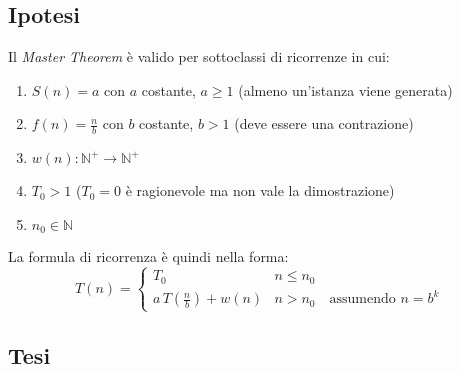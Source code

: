 \subsection{Ipotesi}
Il \textit{Master Theorem} è valido per sottoclassi di ricorrenze in cui:
\begin{enumerate}
    \item $S(n) = a$ con $a$ costante, $a \geq 1$ (almeno un'istanza viene generata)
    \item $f(n) = \frac{n}{b}$ con $b$ costante, $b > 1$ (deve essere una contrazione)
    \item $w(n): \mathbb{N}^+ \rightarrow \mathbb{N}^+$%
    \item $T_0 > 1$ ($ T_0 = 0$ è ragionevole ma non vale la dimostrazione)
    \item $n_0 \in \mathbb{N}$
\end{enumerate}
La formula di ricorrenza è quindi nella forma:
\begin{equation}
    T(n) = 
    \begin{cases} 
        T_0      &  n \leq n_0 \\
        a \, T\left( \frac{n}{b} \right) + w(n) & n > n_0 \quad \text{assumendo } n=b^k
    \end{cases}
    \label{eq:masterricorrenza1}
\end{equation}

\subsection{Tesi}

